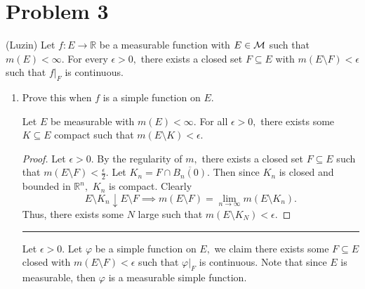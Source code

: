 \documentclass[11pt]{article}
\newcommand{\bbR}{\mathbb{R}}
\newcommand{\sm}{\setminus}
\begin{document}
\newpage
\section*{Problem 3}
\begin{problem}
    (Luzin) Let $f: E \to \bbR$ be a measurable function with $E \in \cal M$ such that $m(E) < \infty.$ For every $\epsilon>0,$ there exists a closed set $F\subseteq E$ with $m(E\sm F) < \epsilon$ such that $f|_F$ is continuous.
\end{problem}
\begin{enumerate}
    \item Prove this when $f$ is a simple function on $E.$
    \begin{solution}
\begin{lemma}
    Let $E$ be measurable with $m(E) < \infty.$ For all $\epsilon>0,$ there exists some $K \subseteq E$ compact such that $m(E\sm K) < \epsilon.$
\end{lemma}
\begin{proof}
Let $\epsilon>0.$
    By the regularity of $m,$ there exists a closed set $F\subseteq E$ such that $m(E\sm F)< \frac{\epsilon}{2}.$ Let $K_n  = F \cap \overline{B_n(0)}.$ Then since $K_n$ is closed and bounded in $\bbR^n,$ $K_n$ is compact. Clearly
    \[E\sm K_n \downarrow E\sm F \implies m(E\sm F) = \lim_{n\to \infty}m(E\sm K_n).\] Thus, there exists some $N$ large such that $m(E\sm K_N) < \epsilon.$ 
\end{proof}
\rule{\linewidth}{0.4pt}
        Let $\epsilon>0.$ Let $\varphi$ be a simple function on $E,$ we claim there exists some $F\subseteq E$ closed with $m(E\sm F) < \epsilon$ such that $\varphi|_F$ is continuous. Note that since $E$ is measurable, then $\varphi$ is a measurable simple function.
        

\end{solution}
\end{enumerate}
\end{document}
